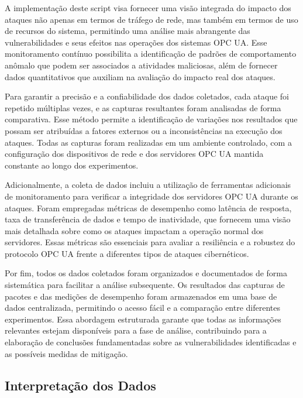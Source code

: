     { \color{red} A implementação deste script visa fornecer uma visão integrada do impacto dos ataques não apenas em termos de tráfego de rede, mas também em termos de uso de recursos do sistema, permitindo uma análise mais abrangente das vulnerabilidades e seus efeitos nas operações dos sistemas OPC UA. Esse monitoramento contínuo possibilita a identificação de padrões de comportamento anômalo que podem ser associados a atividades maliciosas, além de fornecer dados quantitativos que auxiliam na avaliação do impacto real dos ataques.

    Para garantir a precisão e a confiabilidade dos dados coletados, cada ataque foi repetido múltiplas vezes, e as capturas resultantes foram analisadas de forma comparativa. Esse método permite a identificação de variações nos resultados que possam ser atribuídas a fatores externos ou a inconsistências na execução dos ataques. Todas as capturas foram realizadas em um ambiente controlado, com a configuração dos dispositivos de rede e dos servidores OPC UA mantida constante ao longo dos experimentos.

    Adicionalmente, a coleta de dados incluiu a utilização de ferramentas adicionais de monitoramento para verificar a integridade dos servidores OPC UA durante os ataques. Foram empregadas métricas de desempenho como latência de resposta, taxa de transferência de dados e tempo de inatividade, que fornecem uma visão mais detalhada sobre como os ataques impactam a operação normal dos servidores. Essas métricas são essenciais para avaliar a resiliência e a robustez do protocolo OPC UA frente a diferentes tipos de ataques cibernéticos.

    Por fim, todos os dados coletados foram organizados e documentados de forma sistemática para facilitar a análise subsequente. Os resultados das capturas de pacotes e das medições de desempenho foram armazenados em uma base de dados centralizada, permitindo o acesso fácil e a comparação entre diferentes experimentos. Essa abordagem estruturada garante que todas as informações relevantes estejam disponíveis para a fase de análise, contribuindo para a elaboração de conclusões fundamentadas sobre as vulnerabilidades identificadas e as possíveis medidas de mitigação.}

    \subsection{Interpretação dos Dados}

